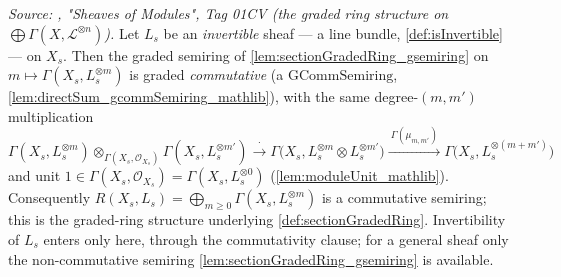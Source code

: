 \begin{lemma}\leanok
  \label{lem:sectionGradedRing_gcommSemiring}
  \textit{Source: \cite{stacks-project}, "Sheaves of Modules", Tag 01CV (the graded
  ring structure on \(\bigoplus \Gamma(X,\mathcal{L}^{\otimes n})\)).}
  Let \(L_s\) be an \emph{invertible} sheaf --- a line bundle,
  \cref{def:isInvertible} --- on \(X_s\). Then the graded semiring of
  \cref{lem:sectionGradedRing_gsemiring} on
  \(m \mapsto \Gamma(X_s, L_s^{\otimes m})\) is graded \emph{commutative} (a
  \(\mathrm{GCommSemiring}\), \cref{lem:directSum_gcommSemiring_mathlib}), with the
  same degree-\((m,m')\) multiplication
  \[
    \Gamma(X_s, L_s^{\otimes m}) \otimes_{\Gamma(X_s,\mathcal{O}_{X_s})}
      \Gamma(X_s, L_s^{\otimes m'})
    \xrightarrow{\ \cdot\ }
    \Gamma\bigl(X_s, L_s^{\otimes m} \otimes L_s^{\otimes m'}\bigr)
    \xrightarrow{\ \Gamma(\mu_{m,m'})\ }
    \Gamma\bigl(X_s, L_s^{\otimes (m+m')}\bigr)
  \]
  and unit \(1 \in \Gamma(X_s, \mathcal{O}_{X_s}) = \Gamma(X_s, L_s^{\otimes 0})\)
  (\cref{lem:moduleUnit_mathlib}). Consequently
  \(R(X_s, L_s) = \bigoplus_{m \ge 0} \Gamma(X_s, L_s^{\otimes m})\) is a
  commutative semiring; this is the graded-ring structure underlying
  \cref{def:sectionGradedRing}. Invertibility of \(L_s\) enters only here, through
  the commutativity clause; for a general sheaf only the non-commutative semiring
  \cref{lem:sectionGradedRing_gsemiring} is available.
\end{lemma}

